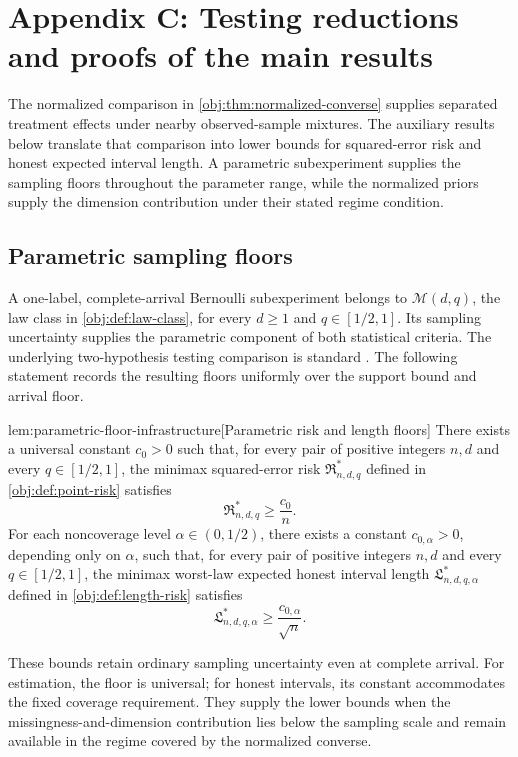 \section{Appendix C: Testing reductions and proofs of the main results}

The normalized comparison in \cref{obj:thm:normalized-converse} supplies separated treatment effects under nearby observed-sample mixtures. The auxiliary results below translate that comparison into lower bounds for squared-error risk and honest expected interval length. A parametric subexperiment supplies the sampling floors throughout the parameter range, while the normalized priors supply the dimension contribution under their stated regime condition.

\subsection{Parametric sampling floors}

A one-label, complete-arrival Bernoulli subexperiment belongs to \(\mathcal M(d,q)\), the law class in \cref{obj:def:law-class}, for every \(d\ge1\) and \(q\in[1/2,1]\). Its sampling uncertainty supplies the parametric component of both statistical criteria. The underlying two-hypothesis testing comparison is standard \citep[Theorem~2.2]{Tsybakov2009}. The following statement records the resulting floors uniformly over the support bound and arrival floor.

\begin{lemmav}{lem:parametric-floor-infrastructure}[Parametric risk and length floors]
There exists a universal constant \(c_0>0\) such that, for every pair of positive integers \(n,d\) and every \(q\in[1/2,1]\), the minimax squared-error risk \(\mathfrak R^*_{n,d,q}\) defined in \cref{obj:def:point-risk} satisfies
\[
\mathfrak R^*_{n,d,q}\ge \frac{c_0}{n}.
\]
For each noncoverage level \(\alpha\in(0,1/2)\), there exists a constant \(c_{0,\alpha}>0\), depending only on \(\alpha\), such that, for every pair of positive integers \(n,d\) and every \(q\in[1/2,1]\), the minimax worst-law expected honest interval length \(\mathfrak L^*_{n,d,q,\alpha}\) defined in \cref{obj:def:length-risk} satisfies
\[
\mathfrak L^*_{n,d,q,\alpha}\ge \frac{c_{0,\alpha}}{\sqrt n}.
\]
\end{lemmav}

These bounds retain ordinary sampling uncertainty even at complete arrival. For estimation, the floor is universal; for honest intervals, its constant accommodates the fixed coverage requirement. They supply the lower bounds when the missingness-and-dimension contribution lies below the sampling scale and remain available in the regime covered by the normalized converse.

